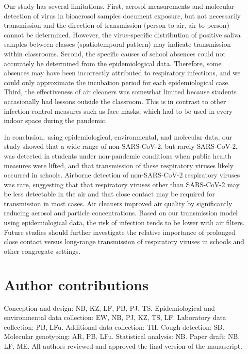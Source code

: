 \documentclass[fleqn,11pt]{wlscirep}
\begin{document}

Our study has several limitations. First, aerosol measurements and molecular detection of virus in bioaerosol samples document exposure, but not necessarily transmission and the direction of transmission (person to air, air to person) cannot be determined. However, the virus-specific distribution of positive saliva samples between classes (spatiotemporal pattern) may indicate transmission within classrooms. Second, the specific causes of school absences could not accurately be determined from the epidemiological data. Therefore, some absences may have been incorrectly attributed to respiratory infections, and we could only approximate the incubation period for each epidemiological case. Third, the effectiveness of air cleaners was somewhat limited because students occasionally had lessons outside the classroom. This is in contrast to other infection control measures such as face masks, which had to be used in every indoor space during the pandemic.


In conclusion, using epidemiological, environmental, and molecular data, our study showed that a wide range of non-SARS-CoV-2, but rarely SARS-CoV-2, was detected in students under non-pandemic conditions when public health measures were lifted, and that transmission of these respiratory viruses likely occurred in schools. Airborne detection of non-SARS-CoV-2 respiratory viruses was rare, suggesting that that respiratory viruses other than SARS-CoV-2 may be less detectable in the air and that close contact may be required for transmission in most cases. Air cleaners improved air quality by significantly reducing aerosol and particle concentrations. Based on our transmission model using epidemiological data, the risk of infection tends to be lower with air filters. Future studies should further investigate the relative importance of prolonged close contact versus long-range transmission of respiratory viruses in schools and other congregate settings.

\newpage


\section*{Author contributions}
Conception and design: NB, KZ, LF, PB, PJ, TS. Epidemiological and environmental data collection: EW, NB, PJ, KZ, TS, LF. Laboratory data collection: PB, LFu. Additional data collection: TH. Cough detection: SB. Molecular genotyping: AR, PB, LFu. Statistical analysis: NB. Paper draft: NB, LF, ME. All authors reviewed and approved the final version of the manuscript.
\end{document}
